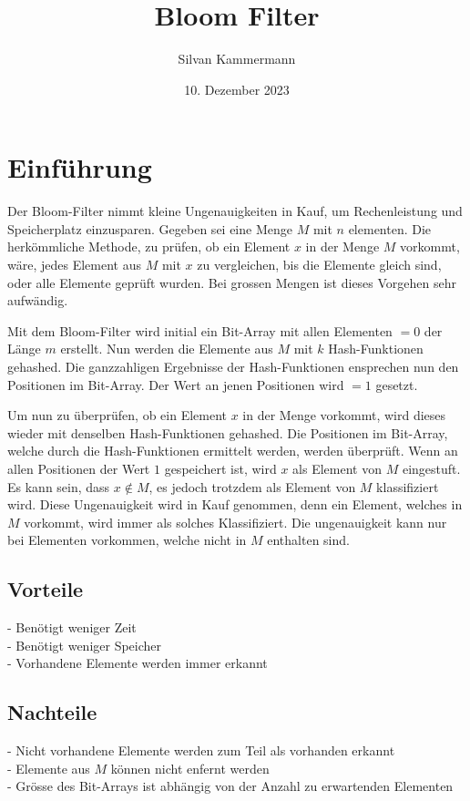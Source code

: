 \documentclass{article}
\title{Bloom Filter}
\author{Silvan Kammermann}
\date{10. Dezember 2023}
\begin{document}
    \maketitle

    \section{Einführung}
    Der Bloom-Filter nimmt kleine Ungenauigkeiten in Kauf, um Rechenleistung und Speicherplatz einzusparen. Gegeben sei eine Menge $M$ mit $n$ elementen. Die herkömmliche Methode, zu prüfen, ob ein Element $x$ in der Menge $M$ vorkommt, wäre, jedes Element aus $M$ mit $x$ zu vergleichen, bis die Elemente gleich sind, oder alle Elemente geprüft wurden. Bei grossen Mengen ist dieses Vorgehen sehr aufwändig.

    Mit dem Bloom-Filter wird initial ein Bit-Array mit allen Elementen $= 0$ der Länge $m$ erstellt. Nun werden die Elemente aus $M$ mit $k$ Hash-Funktionen gehashed. Die ganzzahligen Ergebnisse der Hash-Funktionen ensprechen nun den Positionen im Bit-Array. Der Wert an jenen Positionen wird $= 1$ gesetzt.

    Um nun zu überprüfen, ob ein Element $x$ in der Menge vorkommt, wird dieses wieder mit denselben Hash-Funktionen gehashed. Die Positionen im Bit-Array, welche durch die Hash-Funktionen ermittelt werden, werden überprüft. Wenn an allen Positionen der Wert $1$ gespeichert ist, wird $x$ als Element von $M$ eingestuft. Es kann sein, dass $x \notin M$, es jedoch trotzdem als Element von $M$ klassifiziert wird. Diese Ungenauigkeit wird in Kauf genommen, denn ein Element, welches in $M$ vorkommt, wird immer als solches Klassifiziert. Die ungenauigkeit kann nur bei Elementen vorkommen, welche nicht in $M$ enthalten sind.


    \subsection{Vorteile}
    - Benötigt weniger Zeit \\
    - Benötigt weniger Speicher \\
    - Vorhandene Elemente werden immer erkannt \\

    \subsection{Nachteile}
    - Nicht vorhandene Elemente werden zum Teil als vorhanden erkannt \\
    - Elemente aus $M$ können nicht enfernt werden \\
    - Grösse des Bit-Arrays ist abhängig von der Anzahl zu erwartenden Elementen \\
\end{document}

